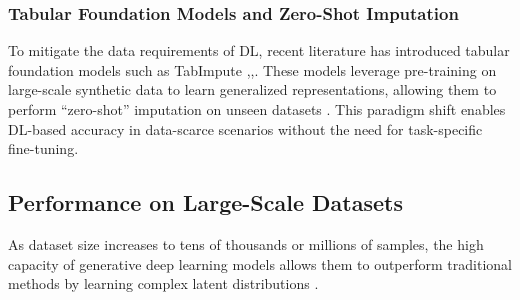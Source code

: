 \documentclass[twocolumn, 9pt]{extarticle}
\begin{document}
\subsubsection{Tabular Foundation Models and Zero-Shot Imputation}
To mitigate the data requirements of DL, recent literature has introduced tabular foundation models such as TabImpute \cite{Kossen2025},\cite{Hollmann2023},. These models leverage pre-training on large-scale synthetic data to learn generalized representations, allowing them to perform ``zero-shot'' imputation on unseen datasets \cite{Kossen2025}. This paradigm shift enables DL-based accuracy in data-scarce scenarios without the need for task-specific fine-tuning.

\subsection{Performance on Large-Scale Datasets}
As dataset size increases to tens of thousands or millions of samples, the high capacity of generative deep learning models allows them to outperform traditional methods by learning complex latent distributions \cite{sun2023deep}.
\end{document}
